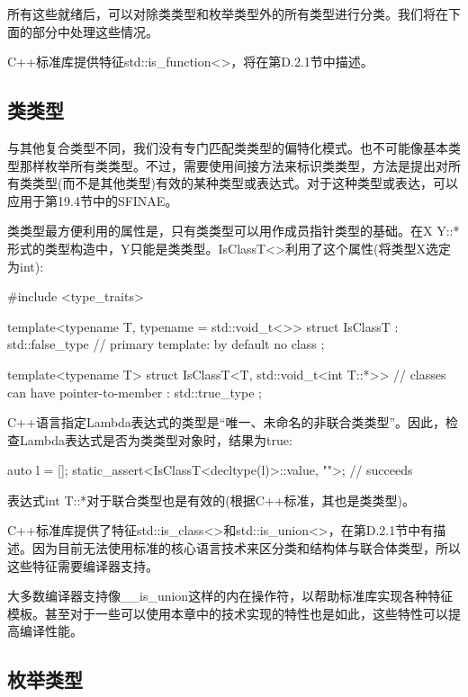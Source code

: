 所有这些就绪后，可以对除类类型和枚举类型外的所有类型进行分类。我们将在下面的部分中处理这些情况。

C++标准库提供特征std::is\_function<>，将在第D.2.1节中描述。

\subsection{类类型}

与其他复合类型不同，我们没有专门匹配类类型的偏特化模式。也不可能像基本类型那样枚举所有类类型。不过，需要使用间接方法来标识类类型，方法是提出对所有类类型(而不是其他类型)有效的某种类型或表达式。对于这种类型或表达，可以应用于第19.4节中的SFINAE。

类类型最方便利用的属性是，只有类类型可以用作成员指针类型的基础。在X Y::*形式的类型构造中，Y只能是类类型。IsClassT<>利用了这个属性(将类型X选定为int):

\begin{cpp}
#include <type_traits>

template<typename T, typename = std::void_t<>>
struct IsClassT : std::false_type { // primary template: by default no class
};

template<typename T>
struct IsClassT<T, std::void_t<int T::*>> // classes can have pointer-to-member
: std::true_type {
};
\end{cpp}

C++语言指定Lambda表达式的类型是“唯一、未命名的非联合类类型”。因此，检查Lambda表达式是否为类类型对象时，结果为true:

\begin{cpp}
auto l = []{};
static_assert<IsClassT<decltype(l)>::value, "">; // succeeds
\end{cpp}

表达式int T::*对于联合类型也是有效的(根据C++标准，其也是类类型)。

C++标准库提供了特征std::is\_class<>和std::is\_union<>，在第D.2.1节中有描述。因为目前无法使用标准的核心语言技术来区分类和结构体与联合体类型，所以这些特征需要编译器支持。

\begin{notice}
大多数编译器支持像\_\_is\_union这样的内在操作符，以帮助标准库实现各种特征模板。甚至对于一些可以使用本章中的技术实现的特性也是如此，这些特性可以提高编译性能。
\end{notice}

\subsection{枚举类型}

